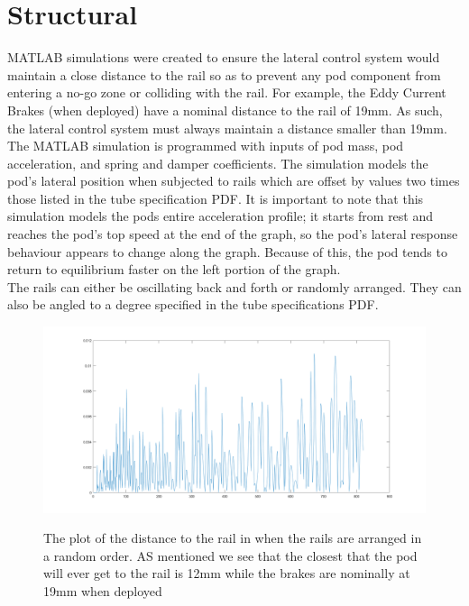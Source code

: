 \documentclass[main.tex]{subfiles}
\begin{document}
    \section{Structural}
    MATLAB simulations were created to ensure the lateral control system would maintain a close distance to the rail so as to prevent any pod component from entering a no-go zone or colliding with the rail. For example, the Eddy Current Brakes (when deployed) have a nominal distance to the rail of 19mm. As such, the lateral control system must always maintain a distance smaller than 19mm.\\
    The MATLAB simulation is programmed with inputs of pod mass, pod acceleration, and spring and damper coefficients. The simulation models the pod's lateral position when subjected to rails which are offset by values two times those listed in the tube specification PDF. It is important to note that this simulation models the pods entire acceleration profile; it starts from rest and reaches the pod's top speed at the end of the graph, so the pod's lateral response behaviour appears to change along the graph. Because of this, the pod tends to return to equilibrium faster on the left portion of the graph. \\
    The rails can either be oscillating back and forth or randomly arranged. They can also be angled to a degree specified in the tube specifications PDF. 
     \begin{figure}
    	\centering
        \includegraphics[width=\linewidth]{images/RandDistToRail}
        \label{fig:RandDistToRail}
        \caption{The plot of the distance to the rail in when the rails are arranged in a random order. AS mentioned we see that the closest that the pod will ever get to the rail is 12mm while the brakes are nominally at 19mm when deployed}
    \end{figure}
\end{document}
